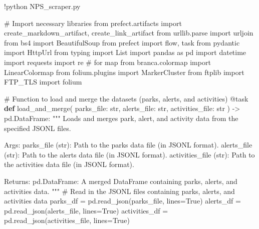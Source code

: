 \documentclass[
  letterpaper,
  DIV=11,
  numbers=noendperiod]{scrartcl}
\newenvironment{Shaded}{\begin{snugshade}}{\end{snugshade}}
\newcommand{\AttributeTok}[1]{\textcolor[rgb]{0.40,0.45,0.13}{#1}}
\newcommand{\BuiltInTok}[1]{\textcolor[rgb]{0.00,0.23,0.31}{#1}}
\newcommand{\CommentTok}[1]{\textcolor[rgb]{0.37,0.37,0.37}{#1}}
\newcommand{\ImportTok}[1]{\textcolor[rgb]{0.00,0.46,0.62}{#1}}
\newcommand{\KeywordTok}[1]{\textcolor[rgb]{0.00,0.23,0.31}{\textbf{#1}}}
\newcommand{\NormalTok}[1]{\textcolor[rgb]{0.00,0.23,0.31}{#1}}
\newcommand{\OperatorTok}[1]{\textcolor[rgb]{0.37,0.37,0.37}{#1}}
\newcommand{\VariableTok}[1]{\textcolor[rgb]{0.07,0.07,0.07}{#1}}
\begin{document}
\begin{Shaded}
\begin{Highlighting}[]
\OperatorTok{!}\NormalTok{python NPS\_scraper.py}
\end{Highlighting}
\end{Shaded}

\begin{Shaded}
\begin{Highlighting}[]
\CommentTok{\# Import necessary libraries}
\ImportTok{from}\NormalTok{ prefect.artifacts }\ImportTok{import}\NormalTok{ create\_markdown\_artifact, create\_link\_artifact}
\ImportTok{from}\NormalTok{ urllib.parse }\ImportTok{import}\NormalTok{ urljoin}
\ImportTok{from}\NormalTok{ bs4 }\ImportTok{import}\NormalTok{ BeautifulSoup}
\ImportTok{from}\NormalTok{ prefect }\ImportTok{import}\NormalTok{ flow, task}
\ImportTok{from}\NormalTok{ pydantic }\ImportTok{import}\NormalTok{ HttpUrl}
\ImportTok{from}\NormalTok{ typing }\ImportTok{import}\NormalTok{ List}
\ImportTok{import}\NormalTok{ pandas }\ImportTok{as}\NormalTok{ pd}
\ImportTok{import}\NormalTok{ datetime}
\ImportTok{import}\NormalTok{ requests}
\ImportTok{import}\NormalTok{ re}
\CommentTok{\# for map}
\ImportTok{from}\NormalTok{ branca.colormap }\ImportTok{import}\NormalTok{ LinearColormap}
\ImportTok{from}\NormalTok{ folium.plugins }\ImportTok{import}\NormalTok{ MarkerCluster}
\ImportTok{from}\NormalTok{ ftplib }\ImportTok{import}\NormalTok{ FTP\_TLS}
\ImportTok{import}\NormalTok{ folium}

\CommentTok{\# Function to load and merge the datasets (parks, alerts, and activities)}
\AttributeTok{@task}
\KeywordTok{def}\NormalTok{ load\_and\_merge(}
\NormalTok{        parks\_file: }\BuiltInTok{str}\NormalTok{,}
\NormalTok{        alerts\_file: }\BuiltInTok{str}\NormalTok{,}
\NormalTok{        activities\_file: }\BuiltInTok{str}
\NormalTok{    ) }\OperatorTok{{-}\textgreater{}}\NormalTok{ pd.DataFrame:}
    \CommentTok{"""}
\CommentTok{    Loads and merges park, alert, and activity data from the specified JSONL files.}

\CommentTok{    Args:}
\CommentTok{        parks\_file (str): Path to the parks data file (in JSONL format).}
\CommentTok{        alerts\_file (str): Path to the alerts data file (in JSONL format).}
\CommentTok{        activities\_file (str): Path to the activities data file (in JSONL format).}

\CommentTok{    Returns:}
\CommentTok{        pd.DataFrame: A merged DataFrame containing parks, alerts, and activities data.}
\CommentTok{    """}
    \CommentTok{\# Read in the JSONL files containing parks, alerts, and activities data}
\NormalTok{    parks\_df }\OperatorTok{=}\NormalTok{ pd.read\_json(parks\_file, lines}\OperatorTok{=}\VariableTok{True}\NormalTok{)}
\NormalTok{    alerts\_df }\OperatorTok{=}\NormalTok{ pd.read\_json(alerts\_file, lines}\OperatorTok{=}\VariableTok{True}\NormalTok{)}
\NormalTok{    activities\_df }\OperatorTok{=}\NormalTok{ pd.read\_json(activities\_file, lines}\OperatorTok{=}\VariableTok{True}\NormalTok{)}


\end{Highlighting}
\end{Shaded}
\end{document}
